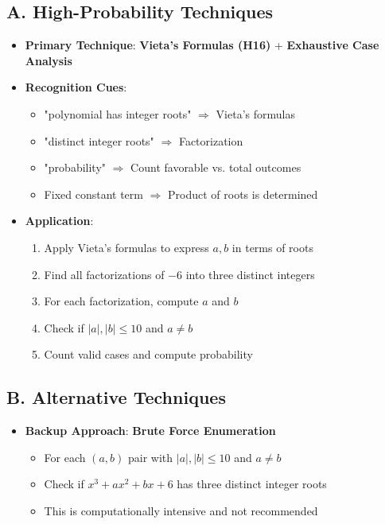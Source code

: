 \documentclass[12pt]{article}
\begin{document}
\begin{techniquesbox}
\subsection*{A. High-Probability Techniques}
\begin{itemize}[leftmargin=*]
    \item \textbf{Primary Technique}: \textbf{Vieta's Formulas (H16)} + \textbf{Exhaustive Case Analysis}
    
    \item \textbf{Recognition Cues}: 
    \begin{itemize}
        \item "polynomial has integer roots" $\Rightarrow$ Vieta's formulas
        \item "distinct integer roots" $\Rightarrow$ Factorization
        \item "probability" $\Rightarrow$ Count favorable vs. total outcomes
        \item Fixed constant term $\Rightarrow$ Product of roots is determined
    \end{itemize}
    
    \item \textbf{Application}:
    \begin{enumerate}
        \item Apply Vieta's formulas to express $a, b$ in terms of roots
        \item Find all factorizations of $-6$ into three distinct integers
        \item For each factorization, compute $a$ and $b$
        \item Check if $|a|, |b| \leq 10$ and $a \neq b$
        \item Count valid cases and compute probability
    \end{enumerate}
\end{itemize}

\subsection*{B. Alternative Techniques}
\begin{itemize}[leftmargin=*]
    \item \textbf{Backup Approach}: \textbf{Brute Force Enumeration}
    \begin{itemize}
        \item For each $(a,b)$ pair with $|a|, |b| \leq 10$ and $a \neq b$
        \item Check if $x^3 + ax^2 + bx + 6$ has three distinct integer roots
        \item This is computationally intensive and not recommended
    \end{itemize}
    

\end{itemize}
\end{techniquesbox}
\end{document}
